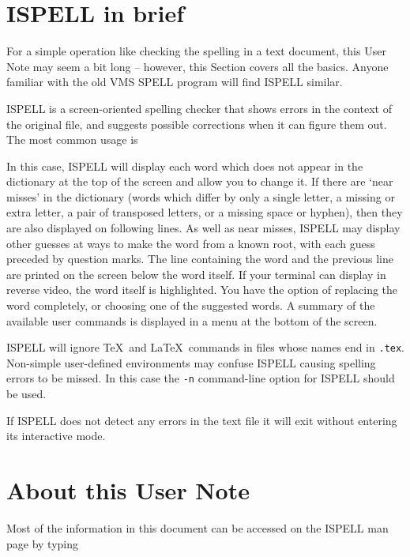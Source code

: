 \documentclass[noabs,nolof,twoside,11pt]{starlink}
\providecommand{\sunspec}[2]{#1}
\begin{document}
\scfrontmatter


\section{ISPELL in brief}

For a simple operation like checking the spelling in a text document, this User
Note may seem a bit long \sunspec{--}{-} however, this Section covers all the
basics.
Anyone familiar with the old VMS SPELL program will find ISPELL similar.

ISPELL is a screen-oriented spelling checker that shows errors in the context
of the original file, and suggests possible corrections when it can figure
them out.  The most common usage is

\begin{terminalv}
\end{terminalv}

In this case, ISPELL will display each word which does not appear in the
dictionary at the top of the screen and allow you to change it.
If there are `near misses' in the dictionary (words which differ by only a
single letter, a missing or extra letter, a pair of transposed letters, or a
missing space or hyphen), then they are also displayed on following lines.
As well as near misses, ISPELL may display other guesses at ways to make the
word from a known root, with each guess preceded by question marks.
The line containing the word and the previous line
are printed on the screen below the word itself. If your terminal can
display in reverse video, the word itself is highlighted.  You have the
option of replacing the word completely, or choosing one of the suggested
words.  A summary of the available user commands is displayed in a menu at the
bottom of the screen.

ISPELL will ignore \TeX\ and \LaTeX\ commands in files whose names end in
\verb+.tex+\@.  Non-simple user-defined environments may confuse ISPELL
causing spelling errors to be missed.
In this case the \verb+-n+ command-line option for ISPELL should be used.

If ISPELL does not detect any errors in the text file it will exit without
entering its interactive mode.


\section{About this User Note}

Most of the information in this document can be accessed on the ISPELL man page
by typing
\end{document}
